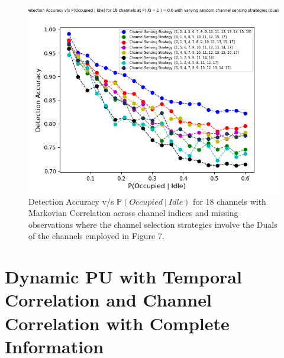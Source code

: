 \documentclass[12pt, draftcls, onecolumn]{IEEEtran}
\begin{document}
\begin{figure}[t]
\includegraphics[width=1.0\textwidth]{Random_Channel_Sensing_Duals.png}
\caption{Detection Accuracy v/s $\mathbb P(Occupied\ |\ Idle)$ for 18 channels with Markovian Correlation across channel indices and missing observations where the channel selection strategies involve the Duals of the channels employed in Figure 7.}
\label{fig:mesh8}
\centering
\end{figure}
\clearpage
\section{Dynamic PU with Temporal Correlation and Channel Correlation with Complete Information}
\end{document}
